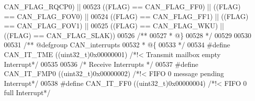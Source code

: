 \begin{DoxyCode}
      CAN_FLAG_RQCP0\textcolor{preprocessor}{)} \textcolor{preprocessor}{||}
00523                                 \textcolor{preprocessor}{(}\textcolor{preprocessor}{(}\textcolor{preprocessor}{FLAG}\textcolor{preprocessor}{)} \textcolor{preprocessor}{==} CAN_FLAG_FF0\textcolor{preprocessor}{)}  \textcolor{preprocessor}{||} \textcolor{preprocessor}{(}\textcolor{preprocessor}{(}\textcolor{preprocessor}{FLAG}\textcolor{preprocessor}{)} \textcolor{preprocessor}{==} 
      CAN_FLAG_FOV0\textcolor{preprocessor}{)} \textcolor{preprocessor}{||}
00524                                 \textcolor{preprocessor}{(}\textcolor{preprocessor}{(}\textcolor{preprocessor}{FLAG}\textcolor{preprocessor}{)} \textcolor{preprocessor}{==} CAN_FLAG_FF1\textcolor{preprocessor}{)} \textcolor{preprocessor}{||} \textcolor{preprocessor}{(}\textcolor{preprocessor}{(}\textcolor{preprocessor}{FLAG}\textcolor{preprocessor}{)} \textcolor{preprocessor}{==} 
      CAN_FLAG_FOV1\textcolor{preprocessor}{)} \textcolor{preprocessor}{||}
00525                                 \textcolor{preprocessor}{(}\textcolor{preprocessor}{(}\textcolor{preprocessor}{FLAG}\textcolor{preprocessor}{)} \textcolor{preprocessor}{==} CAN_FLAG_WKU\textcolor{preprocessor}{)} \textcolor{preprocessor}{||} \textcolor{preprocessor}{(}\textcolor{preprocessor}{(}\textcolor{preprocessor}{FLAG}\textcolor{preprocessor}{)} \textcolor{preprocessor}{==} 
      CAN_FLAG_SLAK\textcolor{preprocessor}{)}\textcolor{preprocessor}{)}
00526 \textcolor{comment}{/**}
00527 \textcolor{comment}{  * @\}}
00528 \textcolor{comment}{  */}
00529 
00530 
00531 \textcolor{comment}{/** @defgroup CAN\_interrupts }
00532 \textcolor{comment}{  * @\{}
00533 \textcolor{comment}{  */}
00534 \textcolor{preprocessor}{#}\textcolor{preprocessor}{define} \textcolor{preprocessor}{CAN\_IT\_TME}                  \textcolor{preprocessor}{(}\textcolor{preprocessor}{(}\textcolor{preprocessor}{uint32\_t}\textcolor{preprocessor}{)}0x00000001\textcolor{preprocessor}{)} \textcolor{comment}{/*!< Transmit mailbox empty Interrupt*/}
00535 
00536 \textcolor{comment}{/* Receive Interrupts */}
00537 \textcolor{preprocessor}{#}\textcolor{preprocessor}{define} \textcolor{preprocessor}{CAN\_IT\_FMP0}                 \textcolor{preprocessor}{(}\textcolor{preprocessor}{(}\textcolor{preprocessor}{uint32\_t}\textcolor{preprocessor}{)}0x00000002\textcolor{preprocessor}{)} \textcolor{comment}{/*!< FIFO 0 message pending Interrupt*/}
00538 \textcolor{preprocessor}{#}\textcolor{preprocessor}{define} \textcolor{preprocessor}{CAN\_IT\_FF0}                  \textcolor{preprocessor}{(}\textcolor{preprocessor}{(}\textcolor{preprocessor}{uint32\_t}\textcolor{preprocessor}{)}0x00000004\textcolor{preprocessor}{)} \textcolor{comment}{/*!< FIFO 0 full Interrupt*/}

\end{DoxyCode}
